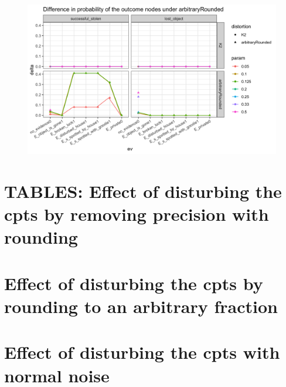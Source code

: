 \documentclass[11pt]{amsart}
\begin{document}
\begin{figure}[htbp]
\begin{center}
\includegraphics[scale=0.17]{images/arbitraryRoundeddeltaSpider.png}
\label{default}
\end{center}
\end{figure}

\section{TABLES: Effect of disturbing the cpts by removing precision with rounding}
\let\oldcentering\centering
\renewcommand\centering{\tiny\oldcentering}

\clearpage
\section{Effect of disturbing the cpts by rounding to an arbitrary fraction}

\clearpage
\section{Effect of disturbing the cpts with normal noise}

\clearpage
\end{document}
